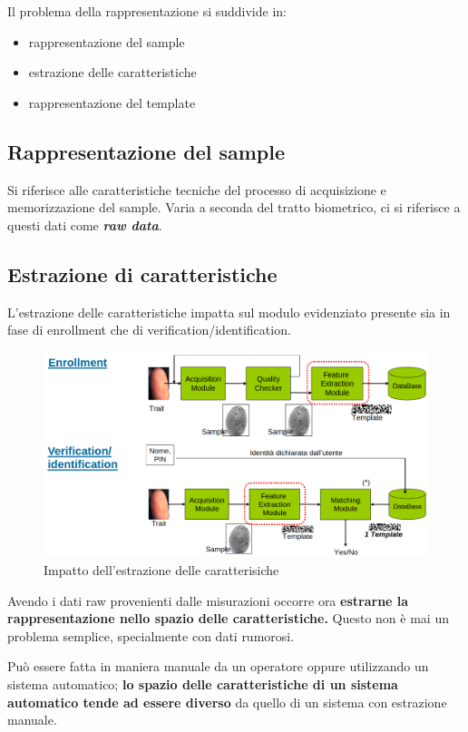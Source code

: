 \documentclass{report}
\begin{document}
\noindent Il problema della rappresentazione si suddivide in:
\begin{itemize}
    \item rappresentazione del sample
    \item estrazione delle caratteristiche
    \item rappresentazione del template
\end{itemize}

\subsection{Rappresentazione del sample}

Si riferisce alle caratteristiche tecniche del processo di acquisizione e memorizzazione del sample.
Varia a seconda del tratto biometrico, ci si riferisce a questi dati come \textbf{\textit{raw data}}.

\subsection{Estrazione di caratteristiche}

L'estrazione delle caratteristiche impatta sul modulo evidenziato
presente sia in fase di enrollment che di verification/identification.

\begin{figure}[ht]
    \centering
    \includegraphics[width=1\linewidth]{images/estrazione.png}
    \caption{Impatto dell'estrazione delle caratterisiche}
\end{figure}

Avendo i dati raw provenienti dalle misurazioni occorre ora \textbf{estrarne la rappresentazione nello spazio delle caratteristiche.}
Questo non è mai un problema semplice, specialmente con dati rumorosi.

\noindent Può essere fatta in maniera manuale da un operatore oppure utilizzando un sistema automatico; \textbf{lo spazio delle 
caratteristiche di un sistema automatico tende ad essere diverso} da quello di un sistema con estrazione manuale.
\end{document}
